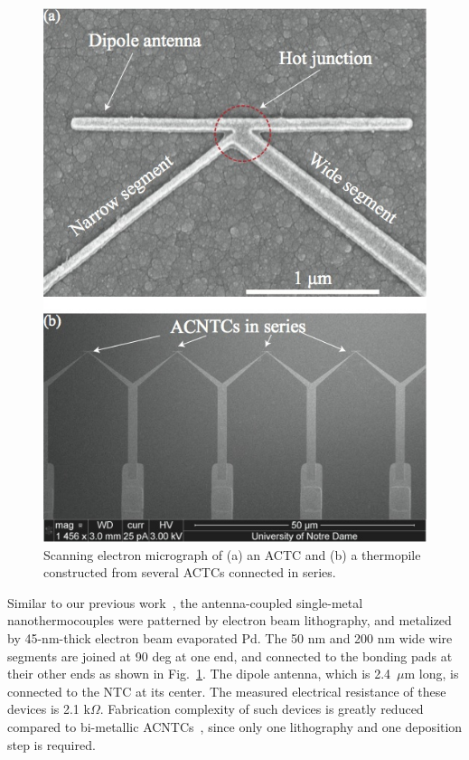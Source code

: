\documentclass[journal]{IEEEtran}
\begin{document}
%
\begin{figure}[h]
\centerline{\includegraphics[width=0.95\columnwidth,clip]{figures/Fig3new}}
\caption{Scanning electron micrograph of (a) an ACTC and (b) a thermopile constructed from several ACTCs connected in series.}
\label{fig1}
\end{figure}
%

Similar to our previous work~\cite{szakmany_single-metal_2014, szakmany_antenna_2013, szakmany_nanowire_2013}, the antenna-coupled single-metal nanothermocouples were patterned by electron beam lithography, and metalized by 45-nm-thick electron beam evaporated Pd. The 50 nm and 200 nm wide wire segments are joined at 90 deg at one end, and connected to the bonding pads at their other ends as shown in Fig.~\ref{fig1}.
The dipole antenna, which is 2.4~$\mu$m long, is connected to the NTC at its center. The measured electrical resistance of these devices is 2.1 k$\Omega$. Fabrication complexity of such devices is greatly reduced compared to bi-metallic ACNTCs~\cite{szakmany_antenna_2013}, since only one lithography and one deposition step is required.
\end{document}
